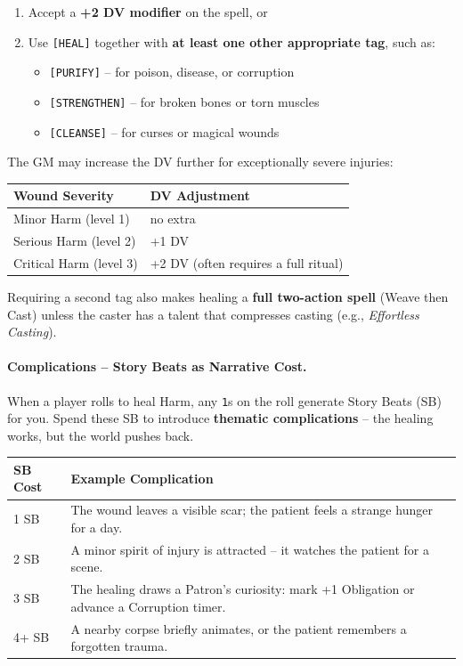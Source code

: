 \begin{enumerate}
  \item Accept a \textbf{+2 DV modifier} on the spell, or
  \item Use \texttt{[HEAL]} together with \textbf{at least one other appropriate tag}, such as:
    \begin{itemize}
      \item \texttt{[PURIFY]} -- for poison, disease, or corruption
      \item \texttt{[STRENGTHEN]} -- for broken bones or torn muscles
      \item \texttt{[CLEANSE]} -- for curses or magical wounds
    \end{itemize}
\end{enumerate}

The GM may increase the DV further for exceptionally severe injuries:
\begin{center}
\begin{tabular}{ll}
\toprule
\textbf{Wound Severity} & \textbf{DV Adjustment} \\
\midrule
Minor Harm (level 1) & no extra \\
Serious Harm (level 2) & +1 DV \\
Critical Harm (level 3) & +2 DV (often requires a full ritual) \\
\bottomrule
\end{tabular}
\end{center}

Requiring a second tag also makes healing a \textbf{full two-action spell} (Weave then Cast) unless the caster has a talent that compresses casting (e.g., \textit{Effortless Casting}).

\paragraph{Complications -- Story Beats as Narrative Cost.}
When a player rolls to heal Harm, any \texttt{1}s on the roll generate Story Beats (SB) for you. Spend these SB to introduce \textbf{thematic complications} -- the healing works, but the world pushes back.

\begin{tcolorbox}[title=Spend SB on Healing Complications, colback=white!97!gray, colframe=black!80!gray,breakable]
\begin{tabularx}{\textwidth}{lX}
\toprule
\textbf{SB Cost} & \textbf{Example Complication} \\
\midrule
1 SB & The wound leaves a visible scar; the patient feels a strange hunger for a day. \\
2 SB & A minor spirit of injury is attracted -- it watches the patient for a scene. \\
3 SB & The healing draws a Patron's curiosity: mark +1 Obligation or advance a Corruption timer. \\
4+ SB & A nearby corpse briefly animates, or the patient remembers a forgotten trauma. \\
\bottomrule
\end{tabularx}
\end{tcolorbox}

